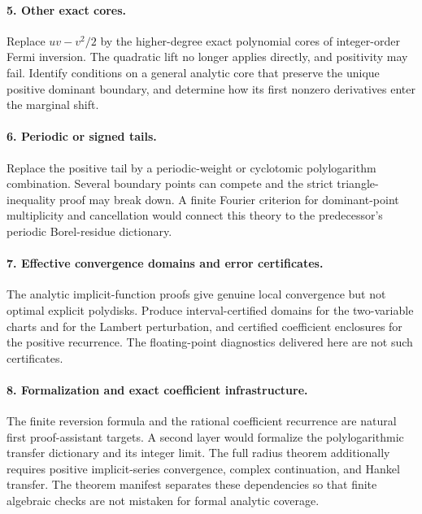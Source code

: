 \documentclass[11pt,a4paper]{article}
\theoremstyle{definition}\newtheorem{definition}[theorem]{Definition}
\theoremstyle{remark}\newtheorem{remark}[theorem]{Remark}
\numberwithin{equation}{section}
\begin{document}
\paragraph{5. Other exact cores.}
Replace $uv-v^2/2$ by the higher-degree exact polynomial cores of
integer-order Fermi inversion. The quadratic lift no longer applies
directly, and positivity may fail. Identify conditions on a general
analytic core that preserve the unique positive dominant boundary, and
determine how its first nonzero derivatives enter the marginal shift.

\paragraph{6. Periodic or signed tails.}
Replace the positive tail by a periodic-weight or cyclotomic
polylogarithm combination. Several boundary points can compete and the
strict triangle-inequality proof may break down. A finite Fourier
criterion for dominant-point multiplicity and cancellation would connect
this theory to the predecessor's periodic Borel-residue dictionary.

\paragraph{7. Effective convergence domains and error certificates.}
The analytic implicit-function proofs give genuine local convergence but
not optimal explicit polydisks. Produce interval-certified domains for
the two-variable charts and for the Lambert perturbation, and certified
coefficient enclosures for the positive recurrence. The floating-point
diagnostics delivered here are not such certificates.

\paragraph{8. Formalization and exact coefficient infrastructure.}
The finite reversion formula and the rational coefficient recurrence are
natural first proof-assistant targets. A second layer would formalize the
polylogarithmic transfer dictionary and its integer limit. The full radius
theorem additionally requires positive implicit-series convergence,
complex continuation, and Hankel transfer. The theorem manifest separates
these dependencies so that finite algebraic checks are not mistaken for
formal analytic coverage.
\end{document}
